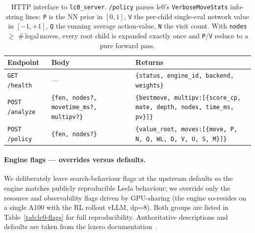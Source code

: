 \begin{table}[h]
\centering
\small
\begin{tabular}{lll}
\toprule
\textbf{Endpoint} & \textbf{Body} & \textbf{Returns} \\
\midrule
\texttt{GET /health} & --- & \texttt{\{status, engine\_id, backend, weights\}} \\
\texttt{POST /analyze} & \texttt{\{fen, nodes?, movetime\_ms?, multipv?\}} & \texttt{\{bestmove, multipv:[\{score\_cp, mate, depth, nodes, time\_ms, pv\}]\}} \\
\texttt{POST /policy} & \texttt{\{fen, nodes?\}} & \texttt{\{value\_root, moves:[\{move, P, N, Q, WL, D, V, U, S, M\}]\}} \\
\bottomrule
\end{tabular}
\caption{HTTP interface to \texttt{lc0\_server}. \texttt{/policy} parses lc0's \texttt{VerboseMoveStats} info-string lines: \texttt{P} is the NN prior in $[0,1]$, \texttt{V} the per-child single-eval network value in $[-1, +1]$, \texttt{Q} the running average action-value, \texttt{N} the visit count. With \texttt{nodes} $\geq$ \#\,legal\,moves, every root child is expanded exactly once and \texttt{P}/\texttt{V} reduce to a pure forward pass.}
\label{tab:lc0-api}
\end{table}

\paragraph{Engine flags --- overrides versus defaults.}
We deliberately leave search-behaviour flags at the upstream defaults so the engine matches publicly reproducible Leela behaviour; we override only the resource and observability flags driven by GPU-sharing (the engine co-resides on a single A100 with the RL rollout vLLM, dp=8). Both groups are listed in Table~\ref{tab:lc0-flags} for full reproducibility. Authoritative descriptions and defaults are taken from the lczero documentation~\cite{lc0flags}.

